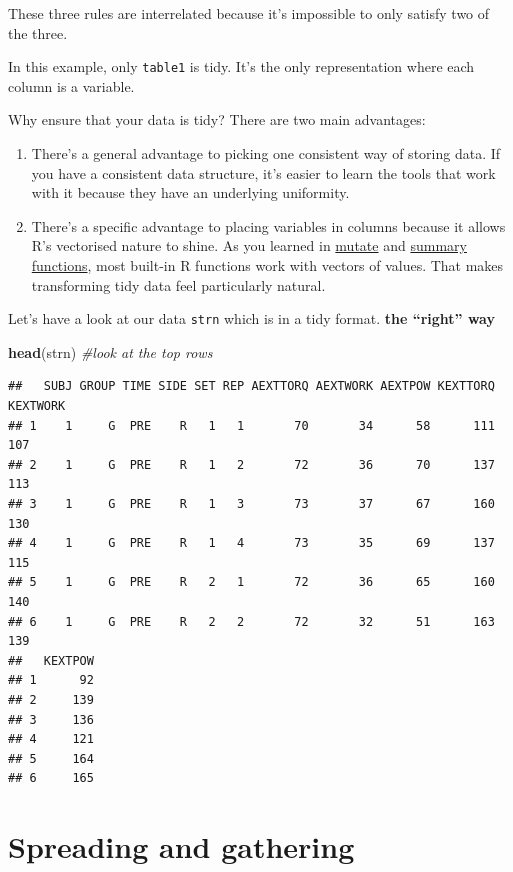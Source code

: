 \documentclass[
]{book}
\newenvironment{Shaded}{\begin{snugshade}}{\end{snugshade}}
\newcommand{\CommentTok}[1]{\textcolor[rgb]{0.56,0.35,0.01}{\textit{#1}}}
\newcommand{\KeywordTok}[1]{\textcolor[rgb]{0.13,0.29,0.53}{\textbf{#1}}}
\newcommand{\NormalTok}[1]{#1}
\begin{document}
These three rules are interrelated because it's impossible to only satisfy two of the three.

In this example, only \texttt{table1} is tidy. It's the only representation where each column is a variable.

Why ensure that your data is tidy? There are two main advantages:

\begin{enumerate}
\def\labelenumi{\arabic{enumi}.}
\item
  There's a general advantage to picking one consistent way of storing
  data. If you have a consistent data structure, it's easier to learn the
  tools that work with it because they have an underlying uniformity.
\item
  There's a specific advantage to placing variables in columns because
  it allows R's vectorised nature to shine. As you learned in
  \protect\hyperlink{mutate-funs}{mutate} and \protect\hyperlink{summary-funs}{summary functions}, most
  built-in R functions work with vectors of values. That makes transforming
  tidy data feel particularly natural.
\end{enumerate}

Let's have a look at our data \texttt{strn} which is in a tidy format. \textbf{the ``right'' way}

\begin{Shaded}
\begin{Highlighting}[]
\KeywordTok{head}\NormalTok{(strn) }\CommentTok{#look at the top rows}
\end{Highlighting}
\end{Shaded}

\begin{verbatim}
##   SUBJ GROUP TIME SIDE SET REP AEXTTORQ AEXTWORK AEXTPOW KEXTTORQ KEXTWORK
## 1    1     G  PRE    R   1   1       70       34      58      111      107
## 2    1     G  PRE    R   1   2       72       36      70      137      113
## 3    1     G  PRE    R   1   3       73       37      67      160      130
## 4    1     G  PRE    R   1   4       73       35      69      137      115
## 5    1     G  PRE    R   2   1       72       36      65      160      140
## 6    1     G  PRE    R   2   2       72       32      51      163      139
##   KEXTPOW
## 1      92
## 2     139
## 3     136
## 4     121
## 5     164
## 6     165
\end{verbatim}

\hypertarget{spreading-and-gathering}{%
\section{Spreading and gathering}\label{spreading-and-gathering}}
\end{document}
